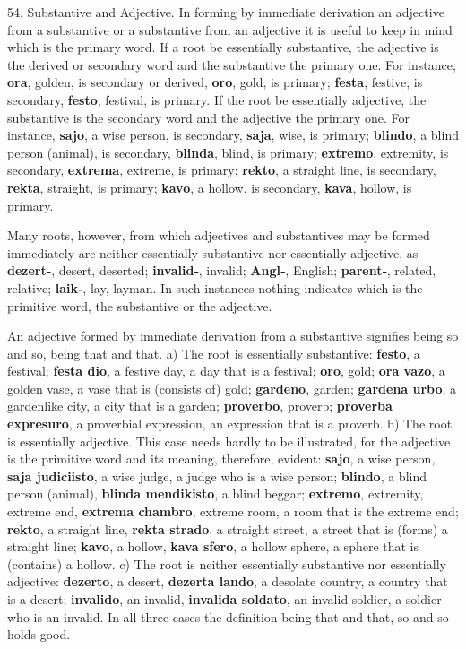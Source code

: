 54. Substantive and Adjective. In forming by immediate derivation an adjective from a substantive or a substantive from an adjective it is useful to keep in mind which is the primary word. If a root be essentially substantive, the adjective is the derived or secondary word and the substantive the primary one. For instance, \textbf{ora}, golden, is secondary or derived, \textbf{oro}, gold, is primary; \textbf{festa}, festive, is secondary, \textbf{festo}, festival, is primary. If the root be essentially adjective, the substantive is the secondary word and the adjective the primary one. For instance, \textbf{sajo}, a wise person, is secondary, \textbf{saja}, wise, is primary; \textbf{blindo}, a blind person (animal), is secondary, \textbf{blinda}, blind, is primary; \textbf{extremo}, extremity, is secondary, \textbf{extrema}, extreme, is primary; \textbf{rekto}, a straight line, is secondary, \textbf{rekta}, straight, is primary; \textbf{kavo}, a hollow, is secondary, \textbf{kava}, hollow, is primary. 

Many roots, however, from which adjectives and substantives may be formed immediately are neither essentially substantive nor essentially adjective, as \linebreak \textbf{dezert‑}, desert, deserted; \textbf{invalid‑}, invalid; \textbf{Angl‑}, English; \textbf{parent‑}, related, relative; \textbf{laik‑}, lay, layman. In such instances nothing indicates which is the primitive word, the substantive or the adjective. 

An adjective formed by immediate derivation from a substantive signifies being so and so, being that and that. a) The root is essentially substantive: \textbf{festo}, a festival; \textbf{festa dio}, a festive day, a day that is a festival; \textbf{oro}, gold; \textbf{ora vazo}, a golden vase, a vase that is (consists of) gold; \textbf{gardeno}, garden; \textbf{gardena urbo}, a gardenlike city, a city that is a garden; \textbf{proverbo}, proverb; \textbf{proverba expresuro}, a proverbial expression, an expression that is a proverb. b) The root is essentially adjective. This case needs hardly to be illustrated, for the adjective is the primitive word and its meaning, therefore, evident: \textbf{sajo}, a wise person, \textbf{saja judiciisto}, a wise judge, a judge who is a wise person; \textbf{blindo}, a blind person (animal), \textbf{blinda mendikisto}, a blind beggar; \textbf{extremo}, extremity, extreme end, \textbf{extrema chambro}, extreme room, a room that is the extreme end; \textbf{rekto}, a straight line, \textbf{rekta strado}, a straight street, a street that is (forms) a straight line; \textbf{kavo}, a hollow, \textbf{kava sfero}, a hollow sphere, a sphere that is (contains) a hollow. c) The root is neither essentially substantive nor essentially adjective: \textbf{dezerto}, a desert, \textbf{dezerta lando}, a desolate country, a country that is a desert; \textbf{invalido}, an invalid, \textbf{invalida soldato}, an invalid soldier, a soldier who is an invalid. In all three cases the definition being that and that, so and so holds good. 

